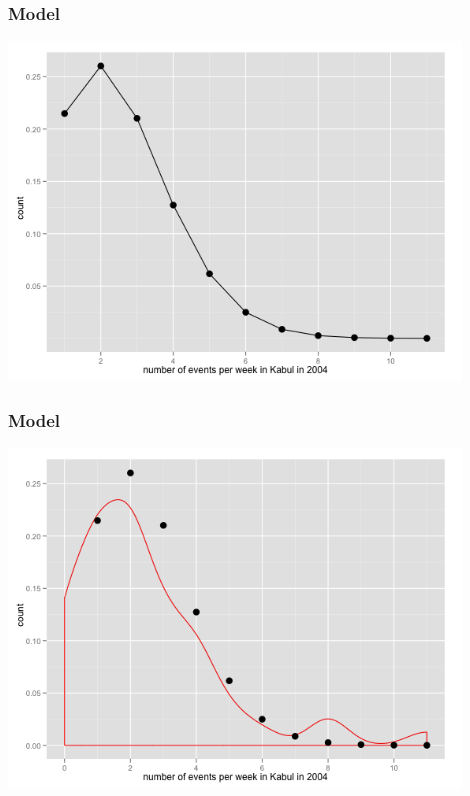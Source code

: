 \documentclass[xcolor=dvipsnames, 9pt]{beamer}
\begin{document}
\begin{frame}
    \frametitle{Model}
    \begin{center}
    \includegraphics[width=0.9\textwidth]{distribution.png}
    \end{center}
\end{frame}

\begin{frame}
    \frametitle{Model}
    \begin{center}
    \includegraphics[width=0.9\textwidth]{density_estimate.png}
    \end{center}
\end{frame}
\end{document}

